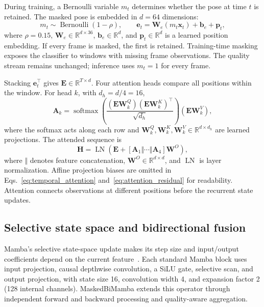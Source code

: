 During training, a Bernoulli variable $m_t$ determines whether the pose at time $t$ is retained. The masked pose is embedded in $d=64$ dimensions:
\begin{equation}
    m_t\sim\operatorname{Bernoulli}(1-\rho),\qquad
    \mathbf e_t=\mathbf W_e(m_t\mathbf x_t)+\mathbf b_e+\mathbf p_t,
    \label{eq:masked_embedding}
\end{equation}
where $\rho=0.15$, $\mathbf W_e\in\mathbb R^{d\times36}$, $\mathbf b_e\in\mathbb R^d$, and $\mathbf p_t\in\mathbb R^d$ is a learned position embedding. If every frame is masked, the first is retained. Training-time masking exposes the classifier to windows with missing frame observations. The quality stream remains unchanged; inference uses $m_t=1$ for every frame.

Stacking $\mathbf e_t^\top$ gives $\mathbf E\in\mathbb R^{T\times d}$. Four attention heads compare all positions within the window. For head $k$, with $d_h=d/4=16$,
\begin{equation}
    \mathbf A_k=\operatorname{softmax}\!\left(
    \frac{(\mathbf E\mathbf W_k^Q)(\mathbf E\mathbf W_k^K)^\top}
    {\sqrt{d_h}}\right)(\mathbf E\mathbf W_k^V),
    \label{eq:temporal_attention}
\end{equation}
where the softmax acts along each row and $\mathbf W_k^Q,\mathbf W_k^K,\mathbf W_k^V\in\mathbb R^{d\times d_h}$ are learned projections. The attended sequence is
\begin{equation}
    \mathbf H=\operatorname{LN}\!\left(
    \mathbf E+[\mathbf A_1\Vert\cdots\Vert\mathbf A_4]\mathbf W^O
    \right),
    \label{eq:attention_residual}
\end{equation}
where $\Vert$ denotes feature concatenation, $\mathbf W^O\in\mathbb R^{d\times d}$, and $\operatorname{LN}$ is layer normalization. Affine projection biases are omitted in Eqs.~\eqref{eq:temporal_attention} and~\eqref{eq:attention_residual} for readability. Attention connects observations at different positions before the recurrent state updates.

\subsection{Selective state space and bidirectional fusion}

Mamba's selective state-space update makes its step size and input/output coefficients depend on the current feature~\cite{gu2023mamba}. Each standard Mamba block uses input projection, causal depthwise convolution, a SiLU gate, selective scan, and output projection, with state size 16, convolution width 4, and expansion factor 2 (128 internal channels). MaskedBiMamba extends this operator through independent forward and backward processing and quality-aware aggregation.

